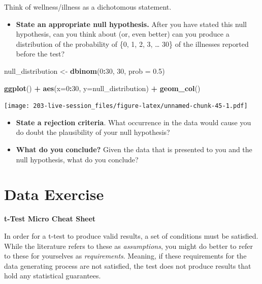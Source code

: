 \documentclass[
]{book}
\newenvironment{Shaded}{\begin{snugshade}}{\end{snugshade}}
\newcommand{\AttributeTok}[1]{\textcolor[rgb]{0.13,0.29,0.53}{#1}}
\newcommand{\DecValTok}[1]{\textcolor[rgb]{0.00,0.00,0.81}{#1}}
\newcommand{\FloatTok}[1]{\textcolor[rgb]{0.00,0.00,0.81}{#1}}
\newcommand{\FunctionTok}[1]{\textcolor[rgb]{0.13,0.29,0.53}{\textbf{#1}}}
\newcommand{\NormalTok}[1]{#1}
\newcommand{\OtherTok}[1]{\textcolor[rgb]{0.56,0.35,0.01}{#1}}
\newcommand{\SpecialCharTok}[1]{\textcolor[rgb]{0.81,0.36,0.00}{\textbf{#1}}}
\providecommand{\tightlist}{%
  \setlength{\itemsep}{0pt}\setlength{\parskip}{0pt}}
\theoremstyle{definition}
\theoremstyle{definition}
\theoremstyle{definition}
\theoremstyle{definition}
\theoremstyle{remark}
\begin{document}
Think of wellness/illness as a dichotomous statement.

\begin{itemize}
\tightlist
\item
  \textbf{State an appropriate null hypothesis.} After you have stated this null hypothesis, can you think about (or, even better) can you produce a distribution of the probability of \{0, 1, 2, 3, \ldots{} 30\} of the illnesses reported before the test?
\end{itemize}

\begin{Shaded}
\begin{Highlighting}[]
\NormalTok{null\_distribution }\OtherTok{\textless{}{-}} \FunctionTok{dbinom}\NormalTok{(}\DecValTok{0}\SpecialCharTok{:}\DecValTok{30}\NormalTok{, }\DecValTok{30}\NormalTok{, }\AttributeTok{prob =} \FloatTok{0.5}\NormalTok{)}

\FunctionTok{ggplot}\NormalTok{() }\SpecialCharTok{+} 
  \FunctionTok{aes}\NormalTok{(}\AttributeTok{x=}\DecValTok{0}\SpecialCharTok{:}\DecValTok{30}\NormalTok{, }\AttributeTok{y=}\NormalTok{null\_distribution) }\SpecialCharTok{+} 
  \FunctionTok{geom\_col}\NormalTok{()}
\end{Highlighting}
\end{Shaded}

\texttt{[image: 203-live-session\_files/figure-latex/unnamed-chunk-45-1.pdf]}

\begin{itemize}
\item
  \textbf{State a rejection criteria}. What occurrence in the data would cause you do doubt the plausibility of your null hypothesis?
\item
  \textbf{What do you conclude?} Given the data that is presented to you and the null hypothesis, what do you conclude?
\end{itemize}

\hypertarget{data-exercise}{%
\section{Data Exercise}\label{data-exercise}}

\textbf{t-Test Micro Cheat Sheet}

In order for a t-test to produce valid results, a set of conditions must be satisfied. While the literature refers to these as \emph{assumptions}, you might do better to refer to these for yourselves as \emph{requirements}. Meaning, if these requirements for the data generating process are not satisfied, the test does not produce results that hold any statistical guarantees.
\end{document}
